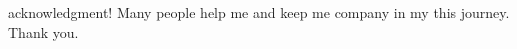 acknowledgment!
Many people help me and keep me company in my this journey.
Thank you.

\begin{vim_bug_workaround}
\end{vim_bug_workaround}

